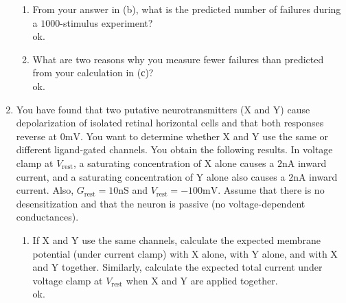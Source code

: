 \documentclass[11pt]{article}
\begin{document}
\begin{enumerate}[label=\arabic*.]
\begin{enumerate}[label=(\alph*)]
\item
From your answer in (b), what is the predicted number of failures during a $1000$-stimulus experiment?
\vspace*{1\baselineskip}
\\
ok.









\item
What are two reasons why you measure fewer failures than predicted from your calculation in (с)?
\vspace*{1\baselineskip}
\\
ok.










\end{enumerate}



\newpage
\item
You have found that two putative neurotransmitters (X and Y) cause depolarization of isolated retinal horizontal cells and that both responses reverse at $0 \text{mV}$. You want to determine whether X and Y use the same or different ligand-gated channels. You obtain the following results. In voltage clamp at $V_{\text{rest}}$, a saturating concentration of X alone causes a $2 \text{nA}$ inward current, and a saturating concentration of Y alone also causes a $2 \text{nA}$ inward current. Also, $G_{\text{rest}} = 10 \text{nS}$ and $V_{\text{rest}} = -100 \text{mV}$. Assume that there is no desensitization and that the neuron is passive (no voltage-dependent conductances).
\begin{enumerate}[label=(\alph*)]
\item
If X and Y use the same channels, calculate the expected membrane potential (under current clamp) with X alone, with Y alone, and with X and Y together. Similarly, calculate the expected total current under voltage clamp at $V_{\text{rest}}$ when X and Y are applied together.
\vspace*{1\baselineskip}
\\
ok.














\end{enumerate}
\end{enumerate}
\end{document}
